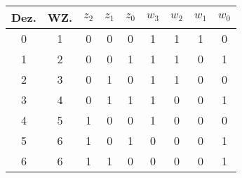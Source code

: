 \begin{table}[H]
    \centering
    \def\arraystretch{1.3}
    \begin{tabular}{|c|c!{\vrule width 1.5pt}c|c|c!{\vrule width 1.5pt}c|c|c|c|}
        \hline
        Dez. & WZ. & $z_2$ & $z_1$ & $z_0$ & $w_3$ & $w_2$ & $w_1$ & $w_0$ \\
            & 1   & 0     & 0     & 0     & 1     & 1     & 1     & 0     \\
        1    & 2   & 0     & 0     & 1     & 1     & 1     & 0     & 1     \\
        2    & 3   & 0     & 1     & 0     & 1     & 1     & 0     & 0     \\
        3    & 4   & 0     & 1     & 1     & 1     & 0     & 0     & 1     \\
        4    & 5   & 1     & 0     & 0     & 1     & 0     & 0     & 0     \\
        5    & 6   & 1     & 0     & 1     & 0     & 0     & 0     & 1     \\
        6    & 6   & 1     & 1     & 0     & 0     & 0     & 0     & 1     \\
        \hline
    \end{tabular}
    \label{tab:gal-mapping-truthtable}
\end{table}

 \newpage


